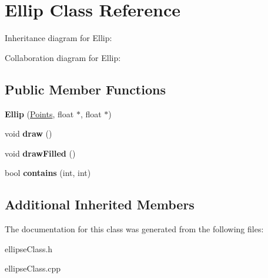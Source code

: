 \hypertarget{classEllip}{}\section{Ellip Class Reference}
\label{classEllip}


Inheritance diagram for Ellip\+:


Collaboration diagram for Ellip\+:
\subsection*{Public Member Functions}
\begin{DoxyCompactItemize}
\item 
{\bfseries Ellip} (\hyperlink{structPoints}{Points}, float $\ast$, float $\ast$)\hypertarget{classEllip_af5a113daf548fb31681265f30f66b86d}{}\label{classEllip_af5a113daf548fb31681265f30f66b86d}

\item 
void {\bfseries draw} ()\hypertarget{classEllip_aab63edad9d977000b92bb7e0d262a388}{}\label{classEllip_aab63edad9d977000b92bb7e0d262a388}

\item 
void {\bfseries draw\+Filled} ()\hypertarget{classEllip_aa4fe1f47b470a64ad48e817ce28ee056}{}\label{classEllip_aa4fe1f47b470a64ad48e817ce28ee056}

\item 
bool {\bfseries contains} (int, int)\hypertarget{classEllip_a09a48d8fe8713d57deb8500c30c51ee4}{}\label{classEllip_a09a48d8fe8713d57deb8500c30c51ee4}

\end{DoxyCompactItemize}
\subsection*{Additional Inherited Members}


The documentation for this class was generated from the following files\+:\begin{DoxyCompactItemize}
\item 
ellipse\+Class.\+h\item 
ellipse\+Class.\+cpp\end{DoxyCompactItemize}
